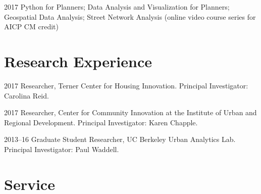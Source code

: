 \documentclass{academiccv}
\begin{document}
\begin{tablist}

\item[2017]		\tab Python for Planners; Data Analysis and Visualization for Planners; Geospatial Data Analysis; Street Network Analysis (online video course series for AICP CM credit)

\end{tablist}



\section*{Research Experience}

\begin{tablist}
	
\item[2017] 	\tab Researcher, Terner Center for Housing Innovation. Principal Investigator: Carolina Reid.

\item[2017] 	\tab Researcher, Center for Community Innovation at the Institute of Urban and Regional Development. Principal Investigator: Karen Chapple.

\item[2013--16] \tab Graduate Student Researcher, UC Berkeley Urban Analytics Lab. Principal Investigator: Paul Waddell.

\end{tablist}



\section*{Service}
\end{document}
